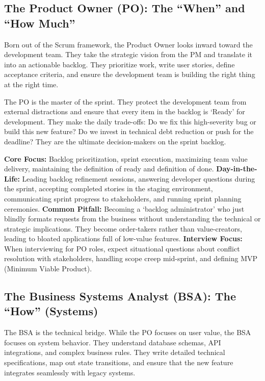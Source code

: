 \documentclass[
  11pt,
  openany,
  oneside]{book}
\begin{document}
\subsection{The Product Owner (PO): The ``When'' and ``How
Much''}\label{the-product-owner-po-the-when-and-how-much}

Born out of the Scrum framework, the Product Owner looks inward toward
the development team. They take the strategic vision from the PM and
translate it into an actionable backlog. They prioritize work, write
user stories, define acceptance criteria, and ensure the development
team is building the right thing at the right time.

The PO is the master of the sprint. They protect the development team
from external distractions and ensure that every item in the backlog is
`Ready' for development. They make the daily trade-offs: Do we fix this
high-severity bug or build this new feature? Do we invest in technical
debt reduction or push for the deadline? They are the ultimate
decision-makers on the sprint backlog.

\textbf{Core Focus:} Backlog prioritization, sprint execution,
maximizing team value delivery, maintaining the definition of ready and
definition of done. \textbf{Day-in-the-Life:} Leading backlog refinement
sessions, answering developer questions during the sprint, accepting
completed stories in the staging environment, communicating sprint
progress to stakeholders, and running sprint planning ceremonies.
\textbf{Common Pitfall:} Becoming a `backlog administrator' who just
blindly formats requests from the business without understanding the
technical or strategic implications. They become order-takers rather
than value-creators, leading to bloated applications full of low-value
features. \textbf{Interview Focus:} When interviewing for PO roles,
expect situational questions about conflict resolution with
stakeholders, handling scope creep mid-sprint, and defining MVP (Minimum
Viable Product).

\subsection{The Business Systems Analyst (BSA): The ``How''
(Systems)}\label{the-business-systems-analyst-bsa-the-how-systems}

The BSA is the technical bridge. While the PO focuses on user value, the
BSA focuses on system behavior. They understand database schemas, API
integrations, and complex business rules. They write detailed technical
specifications, map out state transitions, and ensure that the new
feature integrates seamlessly with legacy systems.
\end{document}
